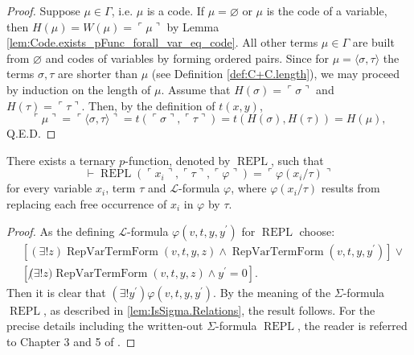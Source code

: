 \begin{proof}
    Suppose $\mu \in \Gamma$, i.e. $\mu$ is a code. 
    If $\mu=\varnothing$ or $\mu$ is the code of a variable,
    then $H(\mu) = W(\mu) = \ulcorner{\mu}\urcorner$ by 
    Lemma \ref{lem:Code.exists_pFunc_forall_var_eq_code}.
    All other terms $\mu \in \Gamma$ are built from $\varnothing$ and codes of variables by
    forming ordered pairs.
    Since for $\mu = \langle \sigma, \tau \rangle$ the terms $\sigma,\tau$ are shorter than $\mu$
    (see Definition \ref{def:C+C.length}), we may proceed by induction on the length of $\mu$.
    Assume that $H(\sigma) = \ulcorner{\sigma}\urcorner$ and $H(\tau) = \ulcorner{\tau}\urcorner$.
    Then, by the definition of $t(x,y)$,
    $$
    \ulcorner{\mu}\urcorner = \ulcorner {\langle \sigma, \tau \rangle} \urcorner =
    t(\ulcorner{\sigma}\urcorner, \ulcorner{\tau}\urcorner) = t(H(\sigma), H(\tau)) = H(\mu),
    $$
    Q.E.D.
\end{proof}

\begin{lemma}
    \label{lem:Code.exists_repl}
    There exists a ternary $p$-function, denoted by $\operatorname{REPL}$, such that
    $$
    \vdash \operatorname{REPL}(\ulcorner{x_i}\urcorner, \ulcorner{\tau}\urcorner, 
    \ulcorner{\varphi}\urcorner) = \ulcorner{\varphi(x_i/\tau)}\urcorner
    $$
    for every variable $x_i$, term $\tau$ and $\mathcal{L}$-formula $\varphi$, where
    $\varphi(x_i/\tau)$ results from replacing each free occurrence of $x_i$ in $\varphi$ by $\tau$.
\end{lemma}

\begin{proof}
    As the defining $\mathcal{L}$-formula $\varphi(v,t,y,y^\prime)$ for $\operatorname{REPL}$ 
    choose:
    \begin{equation*}
        \begin{split}
    & [(\exists!z)\operatorname{RepVarTermForm}(v,t,y,z) \land 
    \operatorname{RepVarTermForm}(v,t,y,y^\prime)] \lor \\
    & [\not (\exists!z)\operatorname{RepVarTermForm}(v,t,y,z) \land y^\prime = 0].
        \end{split}
    \end{equation*}
    Then it is clear that $(\exists!y^\prime)\varphi(v,t,y,y^\prime)$.
    By the meaning of the $\Sigma$-formula $\operatorname{REPL}$, as described in
    \ref{lem:IsSigma.Relations}, the result follows.
    For the precise details including the written-out $\Sigma$-formula $\operatorname{REPL}$,
    the reader is referred to Chapter 3 and 5 of \cite{swierczkowski2003finite}.
\end{proof}

